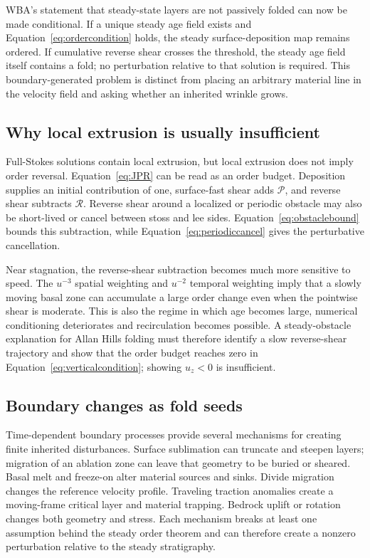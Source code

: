 \documentclass[review]{igs}
\theoremstyle{definition}
\theoremstyle{remark}
\newcommand{\Rpos}{\mathcal{P}}
\newcommand{\Rneg}{\mathcal{R}}
\begin{document}
WBA's statement that steady-state layers are not passively folded can now be made conditional. If a unique steady age field exists and Equation~\eqref{eq:ordercondition} holds, the steady surface-deposition map remains ordered. If cumulative reverse shear crosses the threshold, the steady age field itself contains a fold; no perturbation relative to that solution is required. This boundary-generated problem is distinct from placing an arbitrary material line in the velocity field and asking whether an inherited wrinkle grows.

\subsection{Why local extrusion is usually insufficient}

Full-Stokes solutions contain local extrusion, but local extrusion does not imply order reversal. Equation~\eqref{eq:JPR} can be read as an order budget. Deposition supplies an initial contribution of one, surface-fast shear adds \(\Rpos\), and reverse shear subtracts \(\Rneg\). Reverse shear around a localized or periodic obstacle may also be short-lived or cancel between stoss and lee sides. Equation~\eqref{eq:obstaclebound} bounds this subtraction, while Equation~\eqref{eq:periodiccancel} gives the perturbative cancellation.

Near stagnation, the reverse-shear subtraction becomes much more sensitive to speed. The \(u^{-3}\) spatial weighting and \(u^{-2}\) temporal weighting imply that a slowly moving basal zone can accumulate a large order change even when the pointwise shear is moderate. This is also the regime in which age becomes large, numerical conditioning deteriorates and recirculation becomes possible. A steady-obstacle explanation for Allan Hills folding must therefore identify a slow reverse-shear trajectory and show that the order budget reaches zero in Equation~\eqref{eq:verticalcondition}; showing \(u_z<0\) is insufficient.

\subsection{Boundary changes as fold seeds}

Time-dependent boundary processes provide several mechanisms for creating finite inherited disturbances. Surface sublimation can truncate and steepen layers; migration of an ablation zone can leave that geometry to be buried or sheared. Basal melt and freeze-on alter material sources and sinks. Divide migration changes the reference velocity profile. Traveling traction anomalies create a moving-frame critical layer and material trapping. Bedrock uplift or rotation changes both geometry and stress. Each mechanism breaks at least one assumption behind the steady order theorem and can therefore create a nonzero perturbation relative to the steady stratigraphy.
\end{document}
